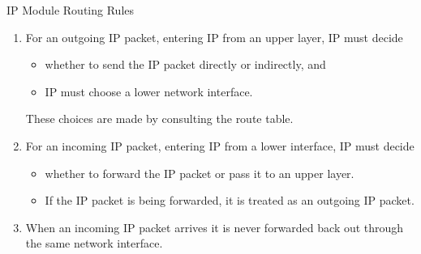 \begin{frame}{IP Module Routing Rules}
  \begin{minipage}{.8\linewidth}
  \begin{enumerate}
  \item For an outgoing IP packet, entering IP from an upper layer, IP must decide
    \begin{itemize}
    \item whether to send the IP packet directly or indirectly, and
    \item IP must choose a lower network interface.
    \end{itemize}
    These choices are made by consulting the route table.
  \item For an incoming IP packet, entering IP from a lower interface, IP must decide
    \begin{itemize}
    \item whether to forward the IP packet or pass it to an upper layer.
    \item If the IP packet is being forwarded, it is treated as an outgoing IP packet.
    \end{itemize}
  \item When an incoming IP packet arrives it is never forwarded back out through the same
    network interface.
  \end{enumerate}
\end{minipage}
\end{frame}

